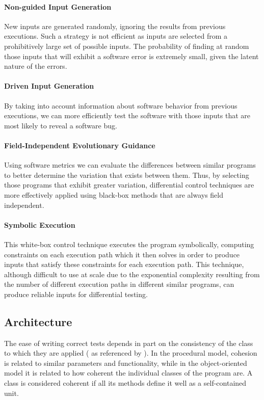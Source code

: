 \documentclass[12pt]{article}
\begin{document}
\paragraph{Non-guided Input Generation}
New inputs are generated randomly, ignoring the results from previous executions. Such a strategy is not efficient as inputs are selected from a prohibitively large set of possible inputs. The probability of finding at random those inputs that will exhibit a software error is extremely small, given the latent nature of the errors.

\paragraph{Driven Input Generation}
By taking into account information about software behavior from previous executions, we can more efficiently test the software with those inputs that are most likely to reveal a software bug.

\paragraph{Field-Independent Evolutionary Guidance}
Using software metrics we can evaluate the differences between similar programs to better determine the variation that exists between them. Thus, by selecting those programs that exhibit greater variation, differential control techniques are more effectively applied using black-box methods that are always field independent.

\paragraph{Symbolic Execution}
This white-box control technique executes the program symbolically, computing constraints on each execution path which it then solves in order to produce inputs that satisfy these constraints for each execution path. This technique, although difficult to use at scale due to the exponential complexity resulting from the number of different execution paths in different similar programs, can produce reliable inputs for differential testing.

\subsection{Architecture}

The ease of writing correct tests depends in part on the consistency of the class to which they are applied (\textcite{yeresime} as referenced
by \textcite{gordon}). In the procedural model, cohesion is related to similar parameters and functionality, while in the object-oriented model it is related to how coherent the individual classes of the program are. A class is considered coherent if all its methods define it well as a self-contained unit.
\end{document}
